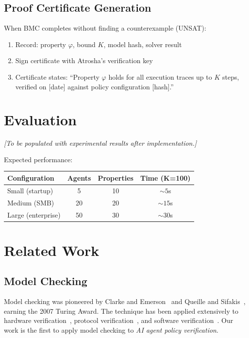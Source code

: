 \documentclass{llncs}
\begin{document}
\subsection{Proof Certificate Generation}

When BMC completes without finding a counterexample (UNSAT):

\begin{enumerate}
    \item Record: property $\varphi$, bound $K$, model hash, solver result
    \item Sign certificate with Atrosha's verification key
    \item Certificate states: ``Property $\varphi$ holds for all execution traces up to $K$ steps, verified on [date] against policy configuration [hash].''
\end{enumerate}

\section{Evaluation}

\textit{[To be populated with experimental results after implementation.]}

Expected performance:
\begin{center}
\begin{tabular}{lccc}
\toprule
\textbf{Configuration} & \textbf{Agents} & \textbf{Properties} & \textbf{Time (K=100)} \\
\midrule
Small (startup) & 5 & 10 & $\sim 5$s \\
Medium (SMB) & 20 & 20 & $\sim 15$s \\
Large (enterprise) & 50 & 30 & $\sim 30$s \\
\bottomrule
\end{tabular}
\end{center}

\section{Related Work}

\subsection{Model Checking}

Model checking was pioneered by Clarke and Emerson~\cite{clarke1981} and Queille and Sifakis~\cite{queille1982}, earning the 2007 Turing Award. The technique has been applied extensively to hardware verification~\cite{mcmillan1993}, protocol verification~\cite{lowe1996}, and software verification~\cite{beyer2011}. Our work is the first to apply model checking to \textit{AI agent policy verification}.
\end{document}
